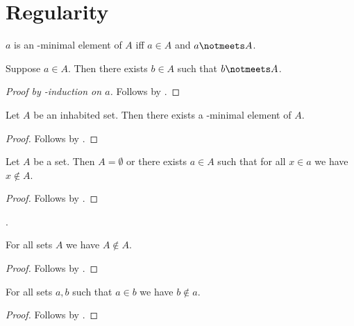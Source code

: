 

\section{Regularity}

\begin{abbreviation}\label{elemminimal}
    $a$ is an \in-minimal element of $A$ iff
    $a\in A$ and $a\notmeets A$.
\end{abbreviation}

\begin{lemma}\label{regularity_aux}
    Suppose $a\in A$.
    Then there exists $b\in A$ such that
    $b\notmeets A$.
\end{lemma}
\begin{proof}[Proof by \in-induction on $a$]
    Follows by .
\end{proof}

\begin{proposition}[Regularity]%
\label{regularity}
    Let $A$ be an inhabited set.
    Then there exists a \in-minimal element of $A$.
\end{proposition}
\begin{proof}
    Follows by .
\end{proof}


\begin{theorem}[Foundation]\label{foundation}
    Let $A$ be a set.
    Then $A = \emptyset$ or there exists $a\in A$
    such that for all $x\in a$ we have $x\notin A$.
\end{theorem}
\begin{proof}
    Follows by .
\end{proof}.

\begin{proposition}\label{in_irrefl}
    For all sets $A$ we have $A\not\in A$.
\end{proposition}
\begin{proof}
    Follows by .
\end{proof}

\begin{proposition}\label{in_asymmetric}
    For all sets $a, b$ such that $a\in b$ we have $b\notin a$.
\end{proposition}
\begin{proof}
    Follows by .
\end{proof}
